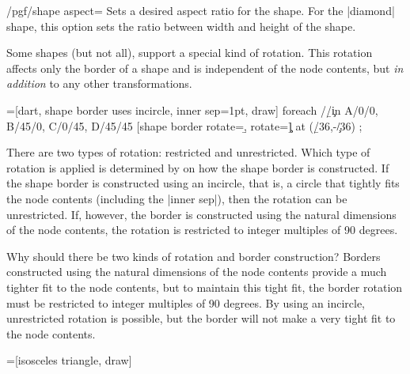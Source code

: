 \begin{key}{/pgf/shape aspect=}
  Sets a desired aspect ratio for the shape. For the |diamond| shape,
  this option sets the ratio between width and height of the shape.
\begin{codeexample}[]
\end{codeexample}
\end{key}

\label{section-rotating-shape-borders}

Some shapes (but not all), support a special kind of rotation. This
rotation affects only the border of a shape and is independent of the
node contents, but \emph{in addition} to any other transformations.
	
\begin{codeexample}[]
=[dart, shape border uses incircle,
  inner sep=1pt, draw]
\tikz \node foreach \a/\b/\c in {A/0/0, B/45/0, C/0/45, D/45/45}
            [shape border rotate=\b, rotate=\c] at (\b/36,-\c/36) {\a};
\end{codeexample}

There are two types of rotation: restricted and unrestricted. Which
type of rotation is applied is determined by on how the shape border
is constructed. If the shape border is constructed using an incircle,
that is, a circle that tightly fits the node contents (including
the |inner sep|), then the rotation can be unrestricted. If, however,
the border is constructed using the natural dimensions of the node
contents, the rotation is restricted to integer multiples of 90
degrees.

Why should there be two kinds of rotation and border construction?
Borders constructed using the natural dimensions of the node contents
provide a much tighter fit to the node contents, but to maintain
this tight fit, the border rotation must be restricted to integer
multiples of 90 degrees. By using an incircle, unrestricted rotation
is possible, but the border will not make a very tight fit to the
node contents.
	
\begin{codeexample}[]
=[isosceles triangle, draw]
\end{codeexample}

